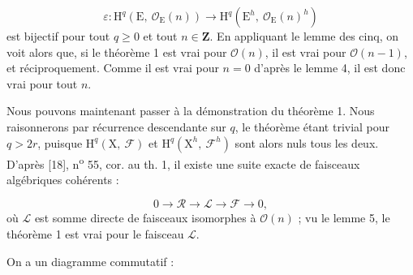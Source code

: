 \begin{equation*}
\varepsilon : \mathrm{H}^{q}(\mathrm{E},\ \mathcal{O}_{\mathrm{E}}(n)) \rightarrow \mathrm{H}^{q}(\mathrm{E}^{h},\ \mathcal{O}_{\mathrm{E}}(n)^{h})
\end{equation*}
est bijectif pour tout $q \geqslant 0$ et tout $n \in \mathbf{Z}$. En appliquant le lemme des cinq, on voit alors que, si le théorème 1 est vrai pour $\mathcal{O}(n)$, il est vrai pour $\mathcal{O}(n-1)$, et réciproquement. Comme il est vrai pour $n = 0$ d'après le lemme 4, il est donc vrai pour tout $n$.

Nous pouvons maintenant passer à la démonstration du théorème 1. Nous raisonnerons par récurrence descendante sur $q$, le théorème étant trivial pour $q > 2r$, puisque $\mathrm{H}^{q}(\mathrm{X},\ \mathcal{F})$ et $\mathrm{H}^{q}(\mathrm{X}^{h},\ \mathcal{F}^{h})$ sont alors nuls tous les deux. D'après [18], n\textsuperscript{o} 55, cor. au th. 1, il existe une suite exacte de faisceaux algébriques cohérents :

\begin{equation*}
0 \rightarrow \mathcal{R} \rightarrow \mathcal{L} \rightarrow \mathcal{F} \rightarrow 0,
\end{equation*}
où $\mathcal{L}$ est somme directe de faisceaux isomorphes à $\mathcal{O}(n)$ ; vu le lemme 5, le théorème 1 est vrai pour le faisceau $\mathcal{L}$.

On a un diagramme commutatif :

